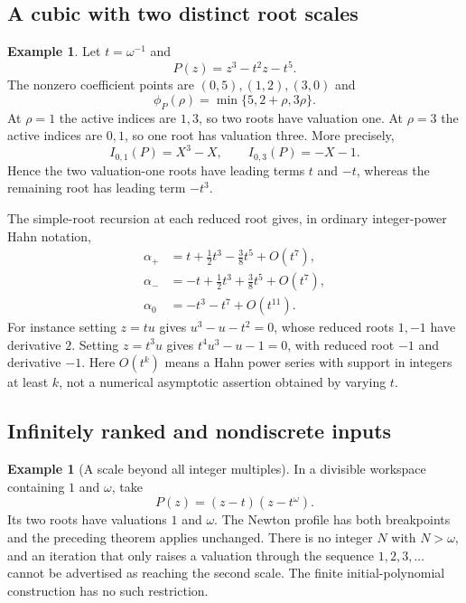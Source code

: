 \documentclass[11pt,letterpaper]{article}
\numberwithin{equation}{section}
\theoremstyle{definition}
\newtheorem{example}[theorem]{Example}
\theoremstyle{remark}\newtheorem{remark}[theorem]{Remark}
\begin{document}
\subsection{A cubic with two distinct root scales}
\begin{example}\label{ex:newtoncubic}
Let $t=\omega^{-1}$ and
\[
 P(z)=z^3-t^2z-t^5.
\]
The nonzero coefficient points are $(0,5),(1,2),(3,0)$ and
\[
 \phi_P(\rho)=\min\{5,2+\rho,3\rho\}.
\]
At $\rho=1$ the active indices are $1,3$, so two roots have valuation
one. At $\rho=3$ the active indices are $0,1$, so one root has valuation
three. More precisely,
\[
 I_{0,1}(P)=X^3-X,\qquad I_{0,3}(P)=-X-1.
\]
Hence the two valuation-one roots have leading terms $t$ and $-t$,
whereas the remaining root has leading term $-t^3$.

The simple-root recursion at each reduced root gives, in ordinary
integer-power Hahn notation,
\begin{align*}
 \alpha_+&=t+\tfrac12t^3-\tfrac38t^5+O(t^7),\\
 \alpha_-&=-t+\tfrac12t^3+\tfrac38t^5+O(t^7),\\
 \alpha_0&=-t^3-t^7+O(t^{11}).
\end{align*}
For instance setting $z=tu$ gives $u^3-u-t^2=0$, whose reduced roots
$1,-1$ have derivative $2$. Setting $z=t^3u$ gives
$t^4u^3-u-1=0$, with reduced root $-1$ and derivative $-1$.
Here $O(t^k)$ means a Hahn power series with support in integers at
least $k$, not a numerical asymptotic assertion obtained by varying $t$.
\end{example}

\subsection{Infinitely ranked and nondiscrete inputs}
\begin{example}[A scale beyond all integer multiples]\label{ex:highrank}
In a divisible workspace containing $1$ and $\omega$, take
\[
 P(z)=(z-t)(z-t^\omega).
\]
Its two roots have valuations $1$ and $\omega$. The Newton profile has
both breakpoints and the preceding theorem applies unchanged. There is
no integer $N$ with $N>\omega$, and an iteration that only raises a
valuation through the sequence $1,2,3,\ldots$ cannot be advertised as
reaching the second scale. The finite initial-polynomial construction
has no such restriction.
\end{example}
\end{document}

